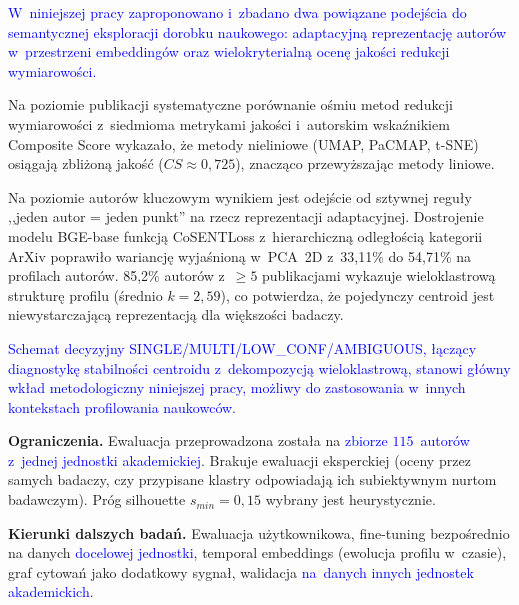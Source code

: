 \documentclass[a4paper,11pt,twocolumn]{article}
\newcommand{\hl}[1]{\textcolor{blue}{#1}}
\begin{document}
\hl{W~niniejszej pracy zaproponowano i~zbadano dwa powiązane podejścia
do semantycznej eksploracji dorobku naukowego: adaptacyjną reprezentację
autorów w~przestrzeni embeddingów oraz wielokryterialną ocenę jakości
redukcji wymiarowości.}

Na poziomie publikacji systematyczne porównanie ośmiu metod redukcji
wymiarowości z~siedmioma metrykami jakości i~autorskim wskaźnikiem
Composite Score wykazało, że metody nieliniowe (UMAP, PaCMAP, t-SNE)
osiągają zbliżoną jakość ($CS \approx 0{,}725$), znacząco przewyższając
metody liniowe.

Na poziomie autorów kluczowym wynikiem jest odejście od sztywnej reguły
,,jeden autor = jeden punkt'' na rzecz reprezentacji adaptacyjnej.
Dostrojenie modelu BGE-base funkcją CoSENTLoss z~hierarchiczną
odległością kategorii ArXiv poprawiło wariancję wyjaśnioną w~PCA~2D
z~33,11\% do 54,71\% na profilach autorów. 85,2\% autorów
z~$\geq 5$ publikacjami wykazuje wieloklastrową strukturę profilu
(średnio $k=2{,}59$), co potwierdza, że pojedynczy centroid jest
niewystarczającą reprezentacją dla większości badaczy.

\hl{Schemat decyzyjny SINGLE/MULTI/LOW\_CONF/AMBIGUOUS, łączący
diagnostykę stabilności centroidu z~dekompozycją wieloklastrową,
stanowi główny wkład metodologiczny niniejszej pracy, możliwy do
zastosowania w~innych kontekstach profilowania naukowców.}

\textbf{Ograniczenia.} Ewaluacja przeprowadzona została na \hl{zbiorze
$115$~autorów z~jednej jednostki akademickiej}. Brakuje ewaluacji
eksperckiej (oceny przez samych badaczy, czy przypisane klastry
odpowiadają ich subiektywnym nurtom badawczym). Próg silhouette
$s_{min}=0{,}15$ wybrany jest heurystycznie.

\textbf{Kierunki dalszych badań.} Ewaluacja użytkownikowa, fine-tuning
bezpośrednio na danych \hl{docelowej jednostki}, temporal embeddings
(ewolucja profilu w~czasie), graf cytowań jako dodatkowy sygnał,
walidacja \hl{na~danych innych jednostek akademickich}.
\end{document}
